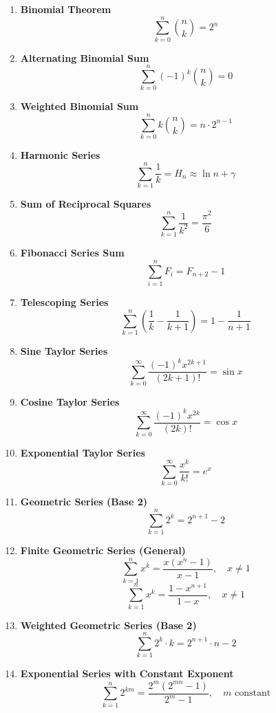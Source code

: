 \begin{enumerate}[leftmargin=*]
    \item \textbf{Binomial Theorem}
        \[\sum_{k=0}^n \binom{n}{k} = 2^n\]
    
    \item \textbf{Alternating Binomial Sum}
        \[\sum_{k=0}^n (-1)^k \binom{n}{k} = 0\]
    
    \item \textbf{Weighted Binomial Sum}
        \[\sum_{k=0}^n k \binom{n}{k} = n \cdot 2^{n-1}\]
    
    \item \textbf{Harmonic Series}
        \[\sum_{k=1}^n \frac{1}{k} = H_n \approx \ln n + \gamma\]
    
    \item \textbf{Sum of Reciprocal Squares}
        \[\sum_{k=1}^n \frac{1}{k^2} = \frac{\pi^2}{6}\]
    
    \item \textbf{Fibonacci Series Sum}
        \[\sum_{i = 1}^{n} F_i = F_{n + 2} - 1\]
    
    \item \textbf{Telescoping Series}
        \[\sum_{k = 1}^{n} \left( \frac{1}{k} - \frac{1}{k + 1} \right) = 1 - \frac{1}{n + 1}\]
    
    \item \textbf{Sine Taylor Series}
        \[\sum_{k = 0}^\infty \frac{(-1)^k x^{2k + 1}}{(2k + 1)!} = \sin x\]
    
    \item \textbf{Cosine Taylor Series}
        \[\sum_{k = 0}^\infty \frac{(-1)^k x^{2k}}{(2k)!} = \cos x\]
    
    \item \textbf{Exponential Taylor Series}
        \[\sum_{k = 0}^\infty \frac{x^k}{k!} = e^x\]
    
    \item \textbf{Geometric Series (Base 2)}
        \[\sum_{k=1}^n 2^k = 2^{n+1} - 2\]
    
    \item \textbf{Finite Geometric Series (General)}
        \[\sum_{k=1}^n x^k = \frac{x(x^n - 1)}{x - 1}, \quad x \neq 1\]
        \[\sum_{k=1}^n x^k = \frac{1 - x^{n+1}}{1 - x}, \quad x \neq 1\]
    
    \item \textbf{Weighted Geometric Series (Base 2)}
        \[\sum_{k=1}^n 2^k \cdot k = 2^{n+1} \cdot n - 2\]
    
    \item \textbf{Exponential Series with Constant Exponent}
        \[\sum_{k=1}^n 2^{km} = \frac{2^m(2^{mn} - 1)}{2^m - 1}, \quad m \text{ constant}\]
\end{enumerate}